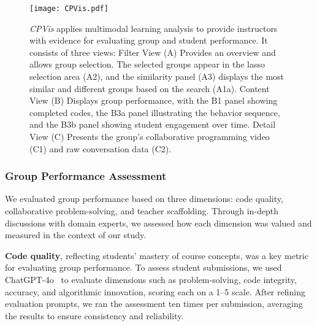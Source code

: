 \begin{figure*}
  \texttt{[image: CPVis.pdf]}
  \caption{ \textit{CPVis} applies multimodal learning analysis to provide instructors with evidence for evaluating group and student performance. It consists of three views:
Filter View (A) Provides an overview and allows group selection. The selected groups appear in the lasso selection area (A2), and the similarity panel (A3) displays the most similar and different groups based on the search (A1a).
Content View (B) Displays group performance, with the B1 panel showing completed codes, the B3a panel illustrating the behavior sequence, and the B3b panel showing student engagement over time.
Detail View (C) Presents the group's collaborative programming video (C1) and raw conversation data (C2).}
  \label{fig:teaser}
  \end{figure*}

\subsubsection{Group Performance Assessment}
We evaluated group performance based on three dimensions: code quality, collaborative problem-solving, and teacher scaffolding. 
Through in-depth discussions with domain experts, we assessed how each dimension was valued and measured in the context of our study.




\label{code}
\textbf{Code quality}, reflecting students' mastery of course concepts, was a key metric for evaluating group performance. To assess student submissions, we used ChatGPT-4o~\cite{gpt4o} to evaluate dimensions such as problem-solving, code integrity, accuracy, and algorithmic innovation, scoring each on a 1–5 scale. After refining evaluation prompts, we ran the assessment ten times per submission, averaging the results to ensure consistency and reliability.





